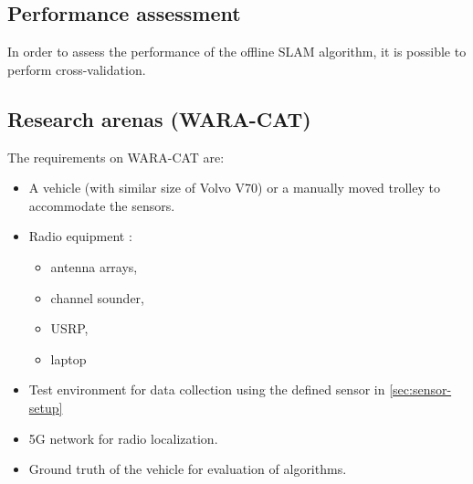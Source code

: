 \subsection{Performance assessment}

In order to assess the performance of the offline \gls{SLAM}
algorithm, it is possible to perform cross-validation.

\subsection{Research arenas (WARA-CAT)}


The requirements on WARA-CAT are:
\begin{itemize}
\item A vehicle (with similar size of Volvo V70) or a manually moved
  trolley to accommodate the sensors.
\item Radio equipment :
  \begin{itemize}
  \item   antenna arrays,
  \item  channel sounder,
  \item USRP,
  \item laptop
  \end{itemize}
  \item Test environment for data collection using the defined sensor in
    \ref{sec:sensor-setup}
\item 5G network for radio localization.
\item Ground truth of the vehicle for evaluation of algorithms.
\end{itemize}


